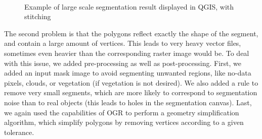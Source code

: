\documentclass{josis}
\begin{document}
\begin{figure}[!htb]
\centering
{}\\
\caption{Example of large scale segmentation result displayed in QGIS, with stitching}
\end{figure}

The second problem is that the polygons reflect exactly the shape of
the segment, and contain a large amount of vertices. This leads to
very heavy vector files, sometimes even heavier than the corresponding
raster image would be. To deal with this issue, we added
pre-processing as well as post-processing. First, we added an input
mask image to avoid segmenting unwanted regions, like no-data
pixels, clouds, or vegetation (if vegetation is not desired). We also
added a rule to remove very small segments, which are more likely to
correspond to segmentation noise than to real objects (this leads to
holes in the segmentation canvas). Last, we again used the
capabilities of OGR to perform a geometry simplification algorithm,
which simplify polygons by removing vertices according to a given
tolerance.
\end{document}
